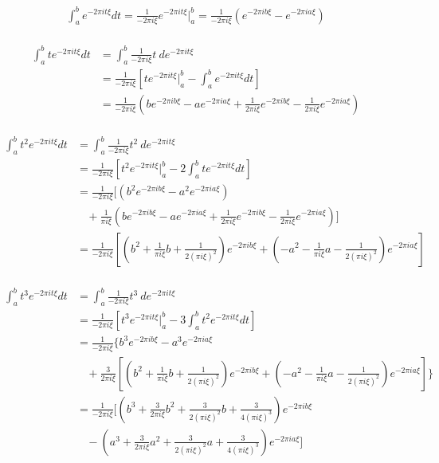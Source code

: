 \documentclass[12pt]{article}
\numberwithin{equation}{section}
\begin{document}
\begin{align}\begin{split}
	\int_{a}^{b} e^{-2\pi i t \xi} dt = \frac{1}{-2\pi i \xi} e^{-2\pi i t \xi} |_a^b = \frac{1}{-2\pi i \xi}(e^{-2\pi i b \xi}-e^{-2\pi i a \xi})
\end{split}\end{align} \par
\begin{align}\begin{split}
	\int_{a}^{b} t e^{-2\pi i t \xi} dt &= \int_{a}^{b} \frac{1}{-2\pi i \xi} t \ de^{-2\pi i t \xi} \\
	&= \frac{1}{-2\pi i \xi} [te^{-2\pi i t \xi} |_a^b - \int_{a}^{b} e^{-2\pi i t \xi} dt ]\\
	&= \frac{1}{-2\pi i \xi} (be^{-2\pi i b \xi}-ae^{-2\pi i a \xi}+\frac{1}{2\pi i \xi}e^{-2\pi i b \xi}-\frac{1}{2\pi i \xi}e^{-2\pi i a \xi})
\end{split}\end{align} \par
\begin{align}\begin{split}
	\int_{a}^{b} t^2 e^{-2\pi i t \xi} dt &= \int_{a}^{b} \frac{1}{-2\pi i \xi} t^2 \ de^{-2\pi i t \xi} \\
	&= \frac{1}{-2\pi i \xi} [t^2 e^{-2\pi i t \xi} |_a^b - 2 \int_{a}^{b} te^{-2\pi i t \xi} dt ]\\
	&= \frac{1}{-2\pi i \xi}[(b^2e^{-2\pi i b \xi}-a^2e^{-2\pi i a \xi})\\
	&\ \ \ \ +\frac{1}{\pi i \xi}(be^{-2\pi i b \xi}-ae^{-2\pi i a \xi}+\frac{1}{2\pi i \xi}e^{-2\pi i b \xi}-\frac{1}{2\pi i \xi}e^{-2\pi i a \xi})]\\
	&= \frac{1}{-2\pi i \xi}[(b^2+\frac{1}{\pi i \xi}b+\frac{1}{2(\pi i \xi)^2})e^{-2\pi i b \xi}+(-a^2-\frac{1}{\pi i \xi}a-\frac{1}{2(\pi i \xi)^2})e^{-2\pi i a \xi}]
\end{split}\end{align} \par
\begin{align}\begin{split}
	\int_{a}^{b} t^3 e^{-2\pi i t \xi} dt &= \int_{a}^{b} \frac{1}{-2\pi i \xi} t^3 \ de^{-2\pi i t \xi} \\
	&= \frac{1}{-2\pi i \xi} [t^3 e^{-2\pi i t \xi} |_a^b - 3 \int_{a}^{b} t^2e^{-2\pi i t \xi} dt ]\\
	&= \frac{1}{-2\pi i \xi} \{b^3 e^{-2\pi i b \xi}-a^3 e^{-2\pi i a \xi} \\
	&\ \ \ \ + \frac{3}{2\pi i \xi}[(b^2+\frac{1}{\pi i \xi}b+\frac{1}{2(\pi i \xi)^2})e^{-2\pi i b \xi}+(-a^2-\frac{1}{\pi i \xi}a-\frac{1}{2(\pi i \xi)^2})e^{-2\pi i a \xi}]\}\\
	&= \frac{1}{-2\pi i \xi} [(b^3 + \frac{3}{2\pi i \xi}b^2+\frac{3}{2(\pi i \xi)^2}b+\frac{3}{4(\pi i \xi)^3})e^{-2\pi i b \xi}\\
	&\ \ \ \ - (a^3 + \frac{3}{2\pi i \xi}a^2+\frac{3}{2(\pi i \xi)^2}a+\frac{3}{4(\pi i \xi)^3})e^{-2\pi i a \xi}]
\end{split}\end{align} \par
\end{document}
